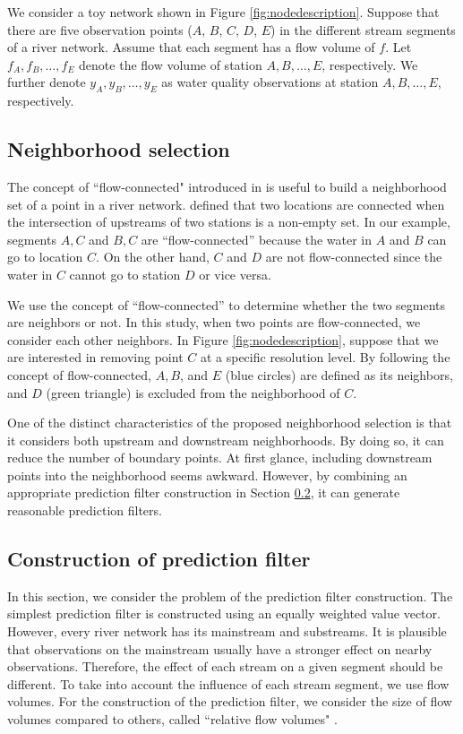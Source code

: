 \documentclass[11pt,titlepage]{article}
\begin{document}
We consider a toy network shown in Figure \ref{fig:nodedescription}. Suppose that there are five observation points ($A$, $B$, $C$, $D$, $E$) in the different stream segments of a river network. Assume that each segment has a flow volume of $f$. Let $f_A, f_B, \ldots, f_E$ denote the flow volume of station $A, B,\ldots, E$, respectively. We further denote $y_A, y_B, \ldots, y_E$ as water quality observations at station $A, B, \ldots, E$, respectively.

\subsection{Neighborhood selection}\label{subsec:nbd}

The concept of ``flow-connected" introduced in \cite{VerHoef(2006)} is useful to build a neighborhood set of a point in a river network. \cite{VerHoef(2006)} defined that two locations are connected when the intersection of upstreams of two stations is a non-empty set. In our example, segments $A, C$ and $B, C$ are ``flow-connected'' because the water in $A$ and $B$ can go to location $C$. On the other hand, $C$ and $D$ are not flow-connected since the water in $C$ cannot go to station $D$ or vice versa. 

We use the concept of ``flow-connected'' to determine whether the two segments are neighbors or not. In this study, when two points are flow-connected, we consider each other neighbors. In Figure \ref{fig:nodedescription}, suppose that we are interested in removing point $C$ at a specific resolution level. By following the concept of flow-connected, $A, B$, and $E$ (blue circles) are defined as its neighbors, and $D$ (green triangle) is excluded from the neighborhood of $C$.

One of the distinct characteristics of the proposed neighborhood selection is that it considers both upstream and downstream neighborhoods. By doing so, it can reduce the number of boundary points. At first glance, including downstream points into the neighborhood seems awkward. However, by combining an appropriate prediction filter construction in Section \ref{subsec:pf}, it can generate reasonable prediction filters.

\subsection{Construction of prediction filter }\label{subsec:pf}

In this section, we consider the problem of the prediction filter construction. The simplest prediction filter is constructed using an equally weighted value vector. However, every river network has its mainstream and substreams. It is plausible that observations on the mainstream usually have a stronger effect on nearby observations. Therefore, the effect of each stream on  a given segment should be different. To take into account the influence of each stream segment, we use flow volumes. For the construction of the prediction filter, we consider the size of flow volumes compared to others, called ``relative flow volumes" \citep{ODonnell2014}.
\end{document}
